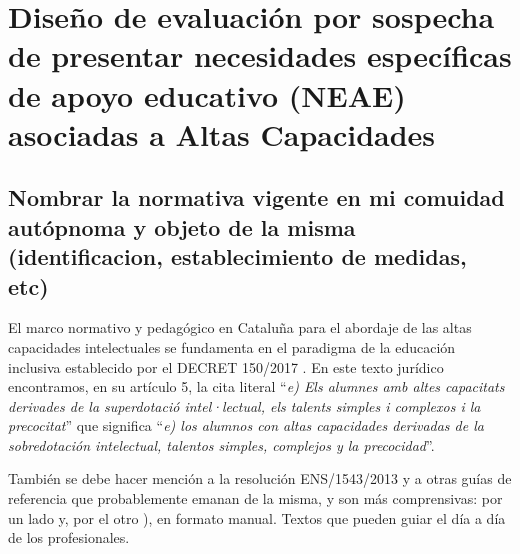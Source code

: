 \documentclass[12pt, a4paper]{article}
\begin{document}
	
	
	
	
	
	
	
	
	
	
	
	
	\newpage
	\section{Diseño de evaluación por sospecha de presentar necesidades específicas de apoyo educativo (NEAE) asociadas a Altas Capacidades}
	

	
	\subsection{Nombrar la normativa vigente en mi comuidad autópnoma y objeto de la misma (identificacion, establecimiento de medidas, etc)}
	

		
	El marco normativo y pedagógico en Cataluña para el abordaje de las altas capacidades intelectuales se fundamenta en el paradigma de la educación inclusiva establecido por el DECRET 150/2017 \parencite{decret150_2017}. En este texto jurídico encontramos, en su artículo 5, la cita literal ``\textit{e) Els alumnes amb altes capacitats derivades de la superdotació intel·lectual, els talents simples i complexos i la precocitat}'' que significa ``\textit{e) los alumnos con altas capacidades derivadas de la sobredotación intelectual, talentos simples, complejos y la precocidad}''.
	
	
	 También se debe hacer mención a la resolución ENS/1543/2013 \parencite{resolucioENS1543_2013} y a otras guías de referencia que probablemente emanan de la misma, y son más comprensivas: por un lado  \textcite{xtecAltesCapacitats} y, por el otro \href{https://educacio.gencat.cat/web/.content/home/departament/publicacions/colleccions/inclusio/altes-capacitats/altes_capacitats.pdf}{\textcite{gencatAltesCapacitats2013}}), en formato manual. Textos que pueden guiar el día a día de los profesionales. 
	 
\end{document}
